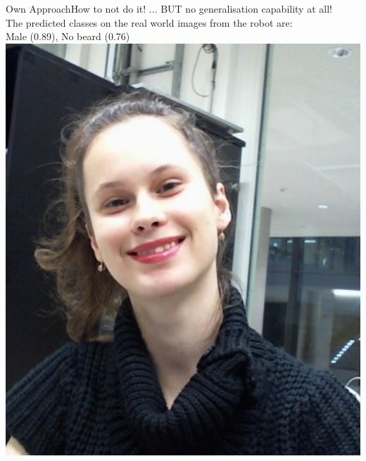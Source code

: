 \documentclass{beamer}
\begin{document}
\begin{frame}{Own Approach}{How to not do it!}
... BUT no generalisation capability at all! \\
The predicted classes on the real world images from the robot are: \\
\centering
Male (0.89), No beard (0.76) \\
\includegraphics[height=0.6\textheight]{figures/failMaleNoBeard} 
\end{frame}
\end{document}
